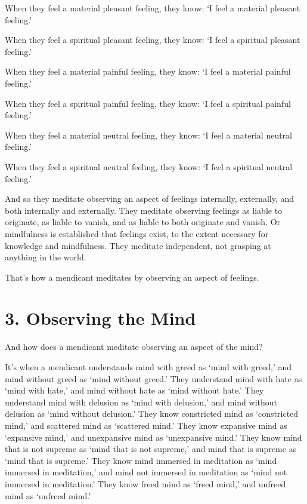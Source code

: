 \documentclass[12pt,openany]{book}%
\begin{document}
When they feel a material pleasant feeling, they know: ‘I feel a material pleasant feeling.’ 

When they feel a spiritual pleasant feeling, they know: ‘I feel a spiritual pleasant feeling.’ 

When they feel a material painful feeling, they know: ‘I feel a material painful feeling.’ 

When they feel a spiritual painful feeling, they know: ‘I feel a spiritual painful feeling.’ 

When they feel a material neutral feeling, they know: ‘I feel a material neutral feeling.’ 

When they feel a spiritual neutral feeling, they know: ‘I feel a spiritual neutral feeling.’ 

And so they meditate observing an aspect of feelings internally, externally, and both internally and externally. They meditate observing feelings as liable to originate, as liable to vanish, and as liable to both originate and vanish. Or mindfulness is established that feelings exist, to the extent necessary for knowledge and mindfulness. They meditate independent, not grasping at anything in the world. 

That’s how a mendicant meditates by observing an aspect of feelings. 

\section*{3. Observing the Mind }

And how does a mendicant meditate observing an aspect of the mind? 

It’s when a mendicant understands mind with greed as ‘mind with greed,’ and mind without greed as ‘mind without greed.’ They understand mind with hate as ‘mind with hate,’ and mind without hate as ‘mind without hate.’ They understand mind with delusion as ‘mind with delusion,’ and mind without delusion as ‘mind without delusion.’ They know constricted mind as ‘constricted mind,’ and scattered mind as ‘scattered mind.’ They know expansive mind as ‘expansive mind,’ and unexpansive mind as ‘unexpansive mind.’ They know mind that is not supreme as ‘mind that is not supreme,’ and mind that is supreme as ‘mind that is supreme.’ They know mind immersed in meditation as ‘mind immersed in meditation,’ and mind not immersed in meditation as ‘mind not immersed in meditation.’ They know freed mind as ‘freed mind,’ and unfreed mind as ‘unfreed mind.’ 
\end{document}
